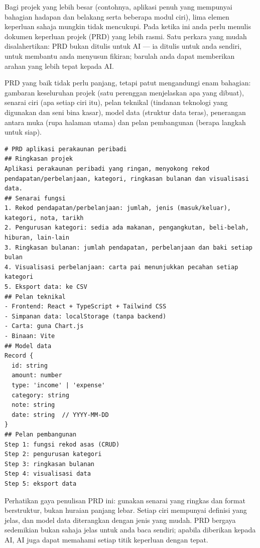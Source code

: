 
Bagi projek yang lebih besar (contohnya, aplikasi penuh yang mempunyai bahagian hadapan dan belakang serta beberapa modul ciri), lima elemen keperluan sahaja mungkin tidak mencukupi. Pada ketika ini anda perlu menulis dokumen keperluan projek (PRD) yang lebih rasmi. Satu perkara yang mudah disalahertikan: PRD bukan ditulis untuk AI — ia ditulis untuk anda sendiri, untuk membantu anda menyusun fikiran; barulah anda dapat memberikan arahan yang lebih tepat kepada AI.

PRD yang baik tidak perlu panjang, tetapi patut mengandungi enam bahagian: gambaran keseluruhan projek (satu perenggan menjelaskan apa yang dibuat), senarai ciri (apa setiap ciri itu), pelan teknikal (tindanan teknologi yang digunakan dan seni bina kasar), model data (struktur data teras), penerangan antara muka (rupa halaman utama) dan pelan pembangunan (berapa langkah untuk siap).

\begin{lstlisting}
# PRD aplikasi perakaunan peribadi
## Ringkasan projek
Aplikasi perakaunan peribadi yang ringan, menyokong rekod pendapatan/perbelanjaan, kategori, ringkasan bulanan dan visualisasi data.
## Senarai fungsi
1. Rekod pendapatan/perbelanjaan: jumlah, jenis (masuk/keluar), kategori, nota, tarikh
2. Pengurusan kategori: sedia ada makanan, pengangkutan, beli-belah, hiburan, lain-lain
3. Ringkasan bulanan: jumlah pendapatan, perbelanjaan dan baki setiap bulan
4. Visualisasi perbelanjaan: carta pai menunjukkan pecahan setiap kategori
5. Eksport data: ke CSV
## Pelan teknikal
- Frontend: React + TypeScript + Tailwind CSS
- Simpanan data: localStorage (tanpa backend)
- Carta: guna Chart.js
- Binaan: Vite
## Model data
Record {
  id: string
  amount: number
  type: 'income' | 'expense'
  category: string
  note: string
  date: string  // YYYY-MM-DD
}
## Pelan pembangunan
Step 1: fungsi rekod asas (CRUD)
Step 2: pengurusan kategori
Step 3: ringkasan bulanan
Step 4: visualisasi data
Step 5: eksport data
\end{lstlisting}

Perhatikan gaya penulisan PRD ini: gunakan senarai yang ringkas dan format berstruktur, bukan huraian panjang lebar. Setiap ciri mempunyai definisi yang jelas, dan model data diterangkan dengan jenis yang mudah. PRD bergaya sedemikian bukan sahaja jelas untuk anda baca sendiri; apabila diberikan kepada AI, AI juga dapat memahami setiap titik keperluan dengan tepat.


